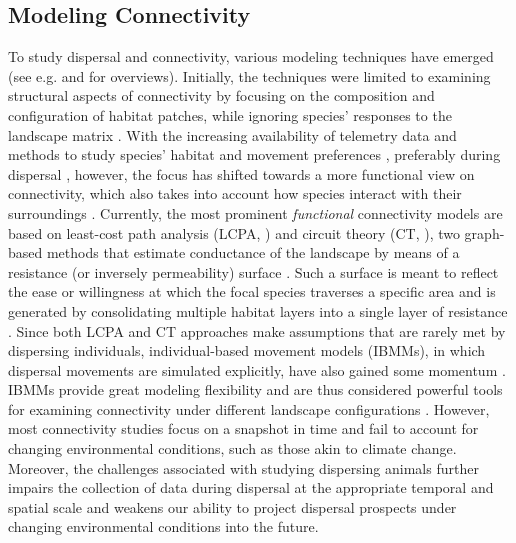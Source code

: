 \documentclass[abstract=on,10pt,a4paper,bibliography=totocnumbered]{article}
\begin{document}
\subsection{Modeling Connectivity}
To study dispersal and connectivity, various modeling techniques have emerged
(see e.g. \citealp{Etherington.2016} and \citealp{Diniz.2019} for overviews).
Initially, the techniques were limited to examining structural aspects of
connectivity by focusing on the composition and configuration of habitat
patches, while ignoring species' responses to the landscape matrix
\citep{Tischendorf.2000, Doerr.2011}. With the increasing availability of
telemetry data and methods to study species' habitat and movement preferences
\citep{Boyce.2002, Fortin.2009, Cushman.2010, Avgar.2016}, preferably during
dispersal \citep{Elliot.2014}, however, the focus has shifted towards a more
functional view on connectivity, which also takes into account how species
interact with their surroundings \citep{Tischendorf.2000, Doerr.2011}.
Currently, the most prominent \textit{functional} connectivity models are based
on least-cost path analysis (LCPA, \citealp{Adriaensen.2003}) and circuit theory
(CT, \citealp{McRae.2008}), two graph-based methods that estimate conductance of
the landscape by means of a resistance (or inversely permeability) surface
\citep{Zeller.2012}. Such a surface is meant to reflect the ease or willingness
at which the focal species traverses a specific area and is generated by
consolidating multiple habitat layers into a single layer of resistance
\citep{Zeller.2012}. Since both LCPA and CT approaches make assumptions that are
rarely met by dispersing individuals, individual-based movement models (IBMMs),
in which dispersal movements are simulated explicitly, have also gained some
momentum \citep{Kanagaraj.2013, Allen.2016, Hauenstein.2019, Diniz.2019,
Zeller.2020, UnnithanKumar.2022, UnnithanKumar.2022a, Hofmann.2023}. IBMMs
provide great modeling flexibility and are thus considered powerful tools for
examining connectivity under different landscape configurations
\citep{Littlefield.2019, UnnithanKumar.2022a}. However, most connectivity
studies focus on a snapshot in time and fail to account for changing
environmental conditions, such as those akin to climate change. Moreover, the
challenges associated with studying dispersing animals further impairs the
collection of data during dispersal at the appropriate temporal and spatial
scale \citep{Graves.2014, Vasudev.2015} and weakens our ability to project
dispersal prospects under changing environmental conditions into the future.
\end{document}
